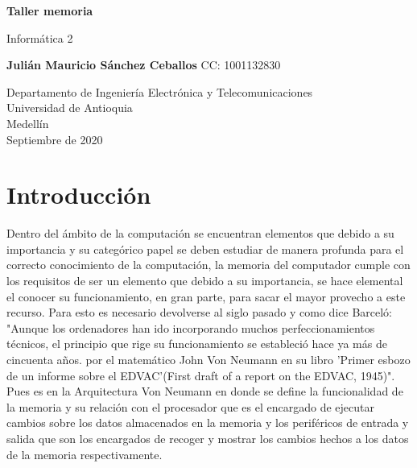 \documentclass{article}
\begin{document}
\begin{titlepage}
    \begin{center}
        \vspace*{1cm}
            
        \Huge
        \textbf{Taller memoria}
            
        \vspace{0.5cm}
        \LARGE
        Informática 2
            
        \vspace{1.5cm}
            
        \textbf{Julián Mauricio Sánchez Ceballos}
         \newline 
            CC: 1001132830   
        \vfill
            
        \vspace{0.8cm}
            
        \Large
        Departamento de Ingeniería Electrónica y Telecomunicaciones\\
        Universidad de Antioquia\\
        Medellín\\
        Septiembre de 2020
            
    \end{center}
\end{titlepage}
\tableofcontents

\newpage
\section{Introducción}
Dentro del ámbito de la computación se encuentran elementos que debido a su importancia y su categórico papel se deben estudiar de manera profunda para el correcto conocimiento de la computación, la memoria del computador cumple con los requisitos de ser un elemento que debido a su importancia, se hace elemental el conocer su funcionamiento, en gran parte, para sacar el mayor provecho a este recurso. Para esto es necesario devolverse al siglo pasado y como dice Barceló: "Aunque los ordenadores han ido incorporando muchos perfeccionamientos técnicos, el principio que rige su funcionamiento se estableció hace ya más de cincuenta años. por el matemático John Von Neumann en su libro 'Primer esbozo de un informe sobre el EDVAC'(First draft of a report on the EDVAC, 1945)"\cite{barcelo}. Pues es en la Arquitectura Von Neumann en donde se define la funcionalidad de la memoria y su relación con el procesador que es el encargado de ejecutar cambios sobre los datos almacenados en la memoria y los periféricos de entrada y salida que son los encargados de recoger y mostrar los cambios hechos a los datos de la memoria respectivamente.\newline
\end{document}
